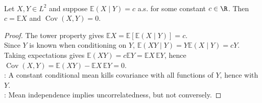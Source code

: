 \begin{corollary} \label{cor:constant-conditional-mean-implies-uncorrelated} \\
Let $X,Y\in L^2$ and suppose $\mathbb{E}(X\mid Y)=c$ a.s. for some constant $c\in\R$. Then $c=\mathbb{E}X$ and $\operatorname{Cov}(X,Y)=0$.
\begin{proof}
The tower property gives $\mathbb{E}X=\mathbb{E}[\mathbb{E}(X\mid Y)]=c$.\\
Since $Y$ is known when conditioning on $Y$, $\mathbb{E}(XY\mid Y)=Y\mathbb{E}(X\mid Y)=cY$.\\
Taking expectations gives $\mathbb{E}(XY)=c\mathbb{E}Y=\mathbb{E}X\,\mathbb{E}Y$, hence $\operatorname{Cov}(X,Y)=\mathbb{E}(XY)-\mathbb{E}X\,\mathbb{E}Y=0$.\\
: A constant conditional mean kills covariance with all functions of $Y$, hence with $Y$.\\
: Mean independence implies uncorrelatedness, but not conversely.
\end{proof}
\end{corollary}
